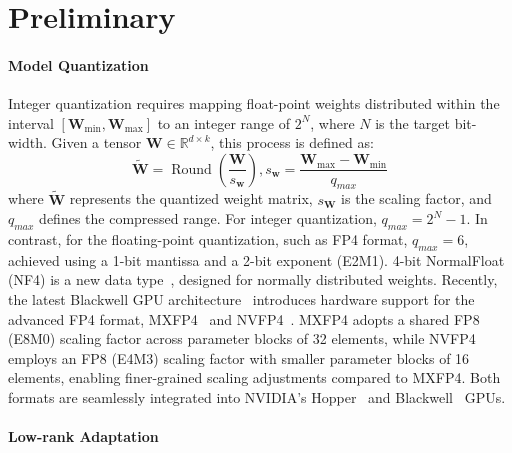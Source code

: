 \section{Preliminary}
\paragraph{Model Quantization}

Integer quantization requires mapping float-point weights distributed within the interval $[\mathbf{W}_{\mathrm{min}}, \mathbf{W}_{\mathrm{max}}]$ to an integer range of $2^N$, where $N$ is the target bit-width. Given a tensor $\mathbf{W}\in \mathbb{R}^{d\times k}$, this process is defined as:
\begin{equation} \label{eq:int_quantization}
    \tilde{\mathbf{W}} = \operatorname{Round}(\frac{\mathbf{W}}{s_{\mathbf{w}}}), s_{\mathbf{w}} = \dfrac{\mathbf{W}_\mathrm{max} - \mathbf{W}_\mathrm{min}}{q_{max}}
\end{equation}
where $\tilde{\mathbf{W}}$ represents the quantized weight matrix, $s_{\mathbf{W}}$ is the scaling factor, and $q_{max}$ defines the compressed range. For integer quantization, $q_{max} = 2^N - 1$. In contrast, for the floating-point quantization, such as FP4 format, $q_{max} = 6$, achieved using a 1-bit mantissa and a 2-bit exponent (E2M1). 4-bit NormalFloat (NF4) is a new data type~\citep{qlora}, designed for normally distributed weights. Recently, the latest Blackwell GPU architecture~\citep{nvidia2024blackwell} introduces hardware support for the advanced FP4 format, MXFP4~\citep{ocp2023microscaling} and NVFP4~\citep{nvidia2024blackwell}. MXFP4 adopts a shared FP8 (E8M0) scaling factor across parameter blocks of 32 elements, while NVFP4 employs an FP8 (E4M3) scaling factor with smaller parameter blocks of 16 elements, enabling finer-grained scaling adjustments compared to MXFP4. Both formats are seamlessly integrated into NVIDIA’s Hopper~\citep{noauthor_nvidia_nodate} and Blackwell~\citep{nvidia2024blackwell} GPUs.

\paragraph{Low-rank Adaptation}

